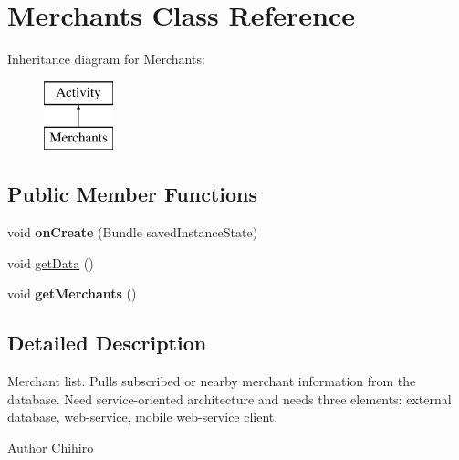 \hypertarget{classapp_1_1localization_1_1_merchants}{\section{Merchants Class Reference}
\label{classapp_1_1localization_1_1_merchants}
}
Inheritance diagram for Merchants\-:\begin{figure}[H]
\begin{center}
\leavevmode
\includegraphics[height=2.000000cm]{classapp_1_1localization_1_1_merchants}
\end{center}
\end{figure}
\subsection*{Public Member Functions}
\begin{DoxyCompactItemize}
\item 
\hypertarget{classapp_1_1localization_1_1_merchants_a85e87cb5ced88dff7c8173ecc4f636d1}{void {\bfseries on\-Create} (Bundle saved\-Instance\-State)}\label{classapp_1_1localization_1_1_merchants_a85e87cb5ced88dff7c8173ecc4f636d1}

\item 
void \hyperlink{classapp_1_1localization_1_1_merchants_a63e4aea9eb9a73812933b509b20b82e5}{get\-Data} ()
\item 
\hypertarget{classapp_1_1localization_1_1_merchants_a093974a9f64140412d47302760989f28}{void {\bfseries get\-Merchants} ()}\label{classapp_1_1localization_1_1_merchants_a093974a9f64140412d47302760989f28}

\end{DoxyCompactItemize}


\subsection{Detailed Description}
Merchant list. Pulls subscribed or nearby merchant information from the database. Need service-\/oriented architecture and needs three elements\-: external database, web-\/service, mobile web-\/service client. \begin{DoxyAuthor}{Author}
Chihiro 
\end{DoxyAuthor}


